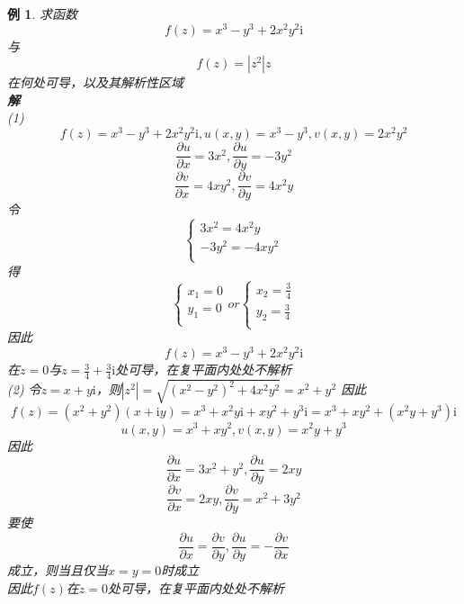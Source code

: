 \documentclass[12pt, a4paper, twoside]{ctexbook}
\newtheorem{example}[theorem]{例}
\begin{document}
\begin{example}
	求函数
	$$
	f\left(z\right)=x^3-y^3+2x^2y^2\mathrm{i}
	$$
	\hspace*{2em}与
	$$
	f\left(z\right)=\left|z^2\right|z
	$$
	\hspace*{2em}在何处可导，以及其解析性区域\\
	\hspace*{1em}\textbf{解}\\
	\hspace*{2em}(1)
	$$
	f\left(z\right)=x^3-y^3+2x^2y^2\mathrm{i},u\left(x,y\right)=x^3-y^3,v\left(x,y\right)=2x^2y^2
	$$
	$$
	\frac{\partial u}{\partial x}=3x^2,\frac{\partial u}{\partial y}=-3y^2
	$$
	$$
	\frac{\partial v}{\partial x}=4xy^2,\frac{\partial v}{\partial y}=4x^2y
	$$
	\hspace*{2em}令
	$$
	\left\{ \begin{array}{l}
		3x^2=4x^2y\\
		-3y^2=-4xy^2\\
	\end{array} \right. 
	$$
	\hspace*{2em}得
	$$
	\left\{ \begin{array}{l}
		x_1=0\\
		y_1=0\\
	\end{array} \right. 
	or
	\left\{ \begin{array}{l}
		x_2=\frac{3}{4}\\
		y_2=\frac{3}{4}\\
	\end{array} \right. 
	$$
	\hspace*{2em}因此
	$$
	f\left(z\right)=x^3-y^3+2x^2y^2\mathrm{i}
	$$
	\hspace*{2em}在$z=0$与$z=\frac{3}{4}+\frac{3}{4}\mathrm{i}$处可导，在复平面内处处不解析\\
	\hspace*{2em}(2)
	令$z=x+y\mathrm{i}$，则$\left|z^2\right|=\sqrt{\left(x^2-y^2\right)^2+4x^2y^2}=x^2+y^2$
	因此
	$$
	f\left(z\right)=\left(x^2+y^2\right)\left(x+\mathrm{i}y\right)=x^3+x^2y\mathrm{i}+xy^2+y^3\mathrm{i}=x^3+xy^2+\left(x^2y+y^3\right)\mathrm{i}
	$$
	$$
	u\left(x,y\right)=x^3+xy^2,v\left(x,y\right)=x^2y+y^3
	$$
	\hspace*{2em}因此
	$$
	\frac{\partial u}{\partial x}=3x^2+y^2,\frac{\partial u}{\partial y}=2xy
	$$
	$$
	\frac{\partial v}{\partial x}=2xy,\frac{\partial v}{\partial y}=x^2+3y^2
	$$
	\hspace*{2em}要使
	$$
	\frac{\partial u}{\partial x}=\frac{\partial v}{\partial y},\frac{\partial u}{\partial y}=-\frac{\partial v}{\partial x}
	$$
	\hspace*{2em}成立，则当且仅当$x=y=0$时成立\\
	\hspace*{2em}因此$f\left(z\right)$在$z=0$处可导，在复平面内处处不解析
\end{example}
\end{document}
